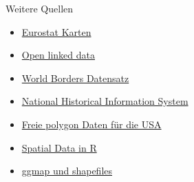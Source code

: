 \documentclass[ignorenonframetext,]{beamer}
\begin{document}
\begin{frame}{Weitere Quellen}
\protect\hypertarget{weitere-quellen}{}

\begin{itemize}
\item
  \href{http://epp.eurostat.ec.europa.eu/portal/page/portal/gisco_Geographical_information_maps/popups/\%20references/administrative_units_statistical_units_1}{Eurostat
  Karten}
\item
  \href{https://www.ordnancesurvey.co.uk/business-and-government/products/opendata-products-grid.html}{Open
  linked data}
\item
  \href{http://thematicmapping.org/downloads/world_borders.php}{World
  Borders Datensatz}
\item
  \href{https://www.nhgis.org/}{National Historical Information System}
\item
  \href{http://www.freemapdata.com/html/free_polygon_data.html}{Freie
  polygon Daten für die USA}
\item
  \href{https://science.nature.nps.gov/im/datamgmt/statistics/r/advanced/spatial.cfm}{Spatial
  Data in R}
\item
  \href{http://www.r-bloggers.com/shapefile-polygons-plotted-on-google-maps-using-ggmap-in-r-throw-some-throw-some-stats-on-that-mappart-2/}{ggmap
  und shapefiles}
\end{itemize}

\end{frame}
\end{document}
